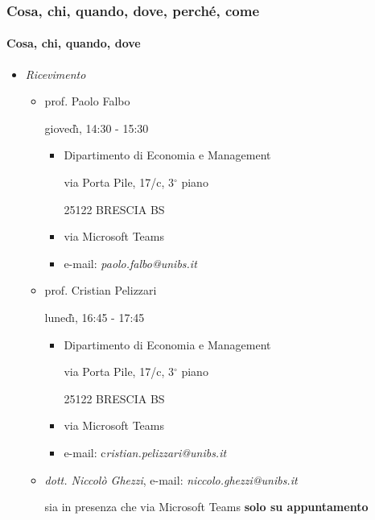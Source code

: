 \documentclass[trans]{beamer}%
\providecommand{\U}[1]{\protect\rule{.1in}{.1in}}
\newenvironment{stepitemize}{\begin{itemize}[<+->]}{\end{itemize} }
\begin{document}
\begin{frame}%
%

\frametitle{Cosa, chi, quando, dove, perch\'{e}, come}%
%

\framesubtitle{Cosa, chi, quando, dove}%
%

%


\begin{stepitemize}
\item \textit{Ricevimento}

\begin{stepitemize}
\item prof. Paolo Falbo

gioved\`{\i}, 14:30 - 15:30

\begin{stepitemize}
\item Dipartimento di Economia e Management

via Porta Pile, 17/c, 3$%
{{}^\circ}%
$ piano

25122 BRESCIA BS

\item via Microsoft Teams

\item e-mail: \textit{paolo.falbo@unibs.it}
\end{stepitemize}

\item prof. Cristian Pelizzari

luned\`{\i}, 16:45 - 17:45

\begin{stepitemize}
\item Dipartimento di Economia e Management

via Porta Pile, 17/c, 3$%
{{}^\circ}%
$ piano

25122 BRESCIA BS

\item via Microsoft Teams

\item e-mail: c\textit{ristian.pelizzari@unibs.it}
\end{stepitemize}

\item \textit{dott. Niccol\`{o} Ghezzi}, e-mail:
\textit{niccolo.ghezzi@unibs.it}

sia in presenza che via Microsoft Teams \textbf{solo su appuntamento}
\end{stepitemize}
\end{stepitemize}

%

\transboxout
\end{frame}%
\end{document}

